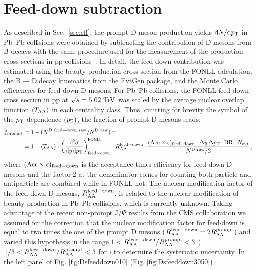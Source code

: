 \section{Feed-down subtraction}
As described in Sec.~\ref{sec:eff}, the prompt D meson production yields ${\rm
d}N/{\rm d}p_{\rm T}$ in Pb--Pb 
collisions were obtained by subtracting the contribution of D mesons 
from B decays with the same procedure used for the measurement of 
the production cross sections in pp collisions~\cite{Acharya:2019mgn}.
In detail, the feed-down contribution was estimated using 
the beauty production cross section from the FONLL calculation,
the B$\rightarrow$D decay kinematics from the EvtGen package,
and the Monte Carlo efficiencies for feed-down D mesons. 
For Pb--Pb collisions, 
the FONLL feed-down cross section in pp at $\sqrt{s}=5.02~{\rm TeV}$ 
was scaled by the average nuclear overlap function $\langle T_{\mathrm{AA}} \rangle$ in
each centrality class.
Thus, omitting for brevity the symbol of the $p_{\rm T}$-dependence $(p_{\rm T})$, 
the fraction of prompt D mesons reads:
\begin{equation}
 \label{eq:fcNbMethod}
 \begin{split}
   f_{\rm prompt} &= 1-(N^{\rm D~feed-down~raw}/N^{\rm D~raw})=\\
   &= 1 - \langle T_{\mathrm{AA}} \rangle 
   \cdot \left( \frac{{\rm d}^2 \sigma}{{\rm d}y \, {\rm d}p_{\rm T} }
\right)^{{\sf FONLL}} _{{\rm feed-down}} \cdot R_{\mathrm{AA}}^{\rm feed-down} \cdot
\frac{({\rm Acc}\times\epsilon)_{\rm feed-down}\cdot\Delta y \, \Delta p_{\rm T}
\cdot {\rm BR} \cdot N_{\rm evt}  }{ N^{\rm D~raw }  / 2} \, ,
 \end{split}
\end{equation}
where $({\rm Acc}\times\epsilon)_{{\rm feed-down}}$ is the 
acceptance-times-efficiency for feed-down D mesons and the factor 2 at the denominator
comes for counting both particle and antiparticle
are combined while in FONLL not. The nuclear modification factor of the feed-down D mesons, $R_{\mathrm{AA}}^{\rm feed-down}$,
is related to the nuclear modification of beauty production in Pb--Pb 
collisions, which is currently unknown. Taking advantage of the
recent non-prompt J/$\Psi$ results from the CMS collaboration we
assumed for the correction that the nuclear modification factor 
for feed-down is equal to two times the one of the prompt D mesons ($R_{\mathrm{AA}}^{\rm feed-down}=2R_{\mathrm{AA}}^{\rm prompt}$) and varied this hypothesis
in the range $1<R_{\mathrm{AA}}^{\rm feed-down}/R_{\mathrm{AA}}^{\rm prompt}<3$ ($1/3<R_{\mathrm{AA}}^{\rm feed-down}/R_{\mathrm{AA}}^{\rm prompt}<3$ for \Dsubs)
to determine the systematic uncertainty. In the left panel of Fig. \ref{fig:Dsfeeddown010} (Fig. \ref{fig:Dsfeeddown3050})
